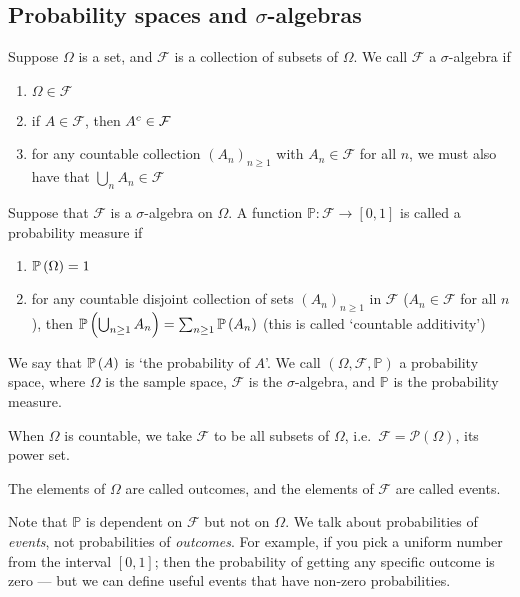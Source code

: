 \subsection{Probability spaces and \(\sigma\)-algebras}
\begin{definition}
	Suppose \(\Omega\) is a set, and \(\mathcal F\) is a collection of subsets of \(\Omega\).
	We call \(\mathcal F\) a \(\sigma\)-algebra if
	\begin{enumerate}
		\item \(\Omega \in \mathcal F\)
		\item if \(A \in \mathcal F\), then \({A}^c \in \mathcal F\)
		\item for any countable collection \((A_n)_{n \geq 1}\) with \(A_n \in \mathcal F\) for all \(n\), we must also have that \(\bigcup_n A_n \in \mathcal F\)
	\end{enumerate}
\end{definition}
\begin{definition}
	Suppose that \(\mathcal F\) is a \(\sigma\)-algebra on \(\Omega\).
	A function \(\mathbb P \colon \mathcal F \to [0, 1]\) is called a probability measure if
	\begin{enumerate}
		\item \(\mathbb{P}\left({\Omega}\right) = 1\)
		\item for any countable disjoint collection of sets \((A_n)_{n \geq 1}\) in \(\mathcal F\) (\(A_n \in \mathcal F\) for all \(n\)), then \(\mathbb{P}\left({\bigcup_{n \geq 1}A_n}\right) = \sum_{n \geq 1} \mathbb{P}\left({A_n}\right)\) (this is called `countable additivity')
	\end{enumerate}
	We say that \(\mathbb{P}\left({A}\right)\) is `the probability of \(A\)'.
	We call \((\Omega, \mathcal F, \mathbb P)\) a probability space, where \(\Omega\) is the sample space, \(\mathcal F\) is the \(\sigma\)-algebra, and \(\mathbb P\) is the probability measure.
\end{definition}

\begin{remark}
	When \(\Omega\) is countable, we take \(\mathcal F\) to be all subsets of \(\Omega\), i.e.\ \(\mathcal F = \mathcal P(\Omega)\), its power set.
\end{remark}
\begin{definition}
	The elements of \(\Omega\) are called outcomes, and the elements of \(\mathcal F\) are called events.
\end{definition}
Note that \(\mathbb P\) is dependent on \(\mathcal F\) but not on \(\Omega\).
We talk about probabilities of \textit{events}, not probabilities of \textit{outcomes}.
For example, if you pick a uniform number from the interval \([0, 1]\); then the probability of getting any specific outcome is zero --- but we can define useful events that have non-zero probabilities.

